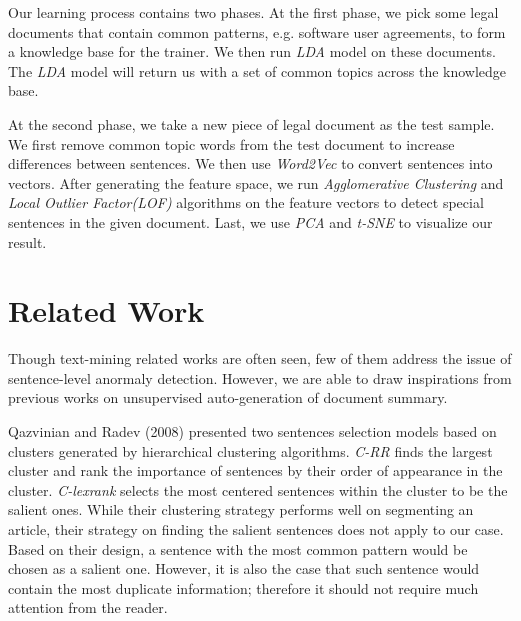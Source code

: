 \documentclass[conference,compsoc]{IEEEtran}
\begin{document}
    Our learning process contains two phases. At the first phase, we pick some legal documents that contain common patterns, e.g. software user agreements, to form a knowledge base for the trainer. We then run \emph{LDA} \cite{lda} model on these documents. The \emph{LDA} model will return us with a set of common topics across the knowledge base.  

    At the second phase, we take a new piece of legal document as the test sample. We first remove common topic words from the test document to increase differences between sentences. We then use \emph{Word2Vec} \cite{one,two} to convert sentences into vectors. After generating the feature space, we run \emph{Agglomerative Clustering} and \emph{Local Outlier Factor(LOF)} \cite{lof} algorithms on the feature vectors to detect special sentences in the given document. Last, we use \emph{PCA} and \emph{t-SNE} to visualize our result. 



\section{Related Work}
  Though text-mining related works are often seen, few of them address the issue of sentence-level anormaly detection. However, we are able to draw inspirations from previous works on unsupervised auto-generation of document summary. 

  Qazvinian and Radev (2008) \cite{reviewcite1} presented two sentences selection models based on clusters generated by hierarchical clustering algorithms. \emph{C-RR} finds the largest cluster and rank the importance of sentences by their order of appearance in the cluster. \emph{C-lexrank} selects the most centered sentences within the cluster to be the salient ones. While their clustering strategy performs well on segmenting an article, their strategy on finding the salient sentences does not apply to our case. Based on their design, a sentence with the most common pattern would be chosen as a salient one. However, it is also the case that such sentence would contain the most duplicate information; therefore it should not require much attention from the reader.  
\end{document}
